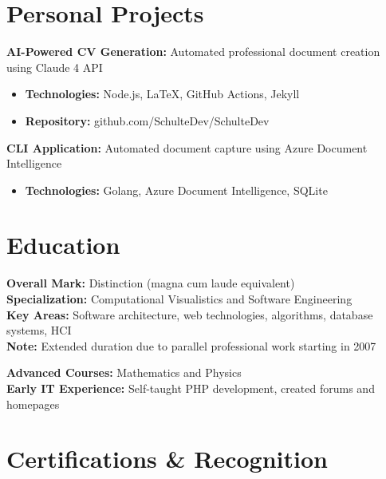 \documentclass[11pt,a4paper,sans]{moderncv}
\begin{document}
\section{Personal Projects}

{
\textbf{AI-Powered CV Generation:} Automated professional document creation using Claude 4 API
\begin{itemize}[noitemsep,topsep=5pt]
\item \textbf{Technologies:} Node.js, LaTeX, GitHub Actions, Jekyll
\item \textbf{Repository:} github.com/SchulteDev/SchulteDev
\end{itemize}
}

{
\textbf{CLI Application:} Automated document capture using Azure Document Intelligence
\begin{itemize}[noitemsep,topsep=5pt]
\item \textbf{Technologies:} Golang, Azure Document Intelligence, SQLite
\end{itemize}
}

\newpage

\section{Education}

{
\textbf{Overall Mark:} Distinction (magna cum laude equivalent)\\
\textbf{Specialization:} Computational Visualistics and Software Engineering\\
\textbf{Key Areas:} Software architecture, web technologies, algorithms, database systems, HCI\\
\textbf{Note:} Extended duration due to parallel professional work starting in 2007
}

\vspace{5pt}

{
\textbf{Advanced Courses:} Mathematics and Physics\\
\textbf{Early IT Experience:} Self-taught PHP development, created forums and homepages
}

\section{Certifications \& Recognition}
\end{document}
